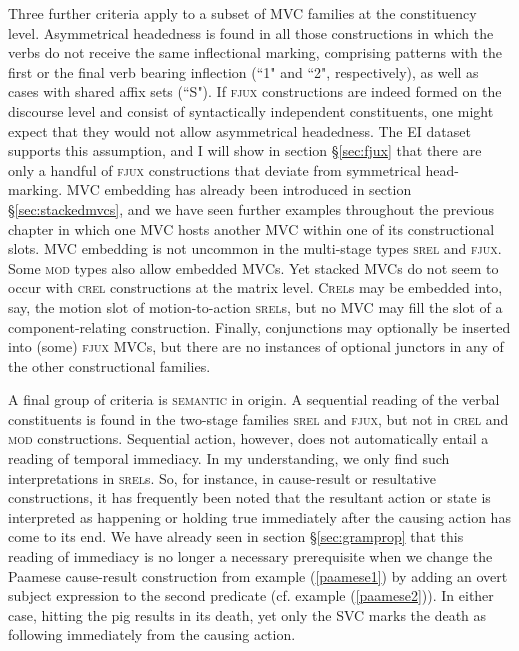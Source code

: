 Three further criteria apply to a subset of MVC families at the constituency level. Asymmetrical headedness is found in all those constructions in which the verbs do not receive the same inflectional marking, comprising patterns with the first or the final verb bearing inflection (``1" and ``2", respectively), as well as cases with shared affix sets (``S"). If \textsc{fjux} constructions are indeed formed on the discourse level and consist of syntactically independent constituents, one might expect that they would not allow asymmetrical headedness. The EI dataset supports this assumption, and I will show in section §\ref{sec:fjux} that there are only a handful of \textsc{fjux} constructions that deviate from symmetrical head-marking. MVC embedding has already been introduced in section §\ref{sec:stackedmvcs}, and we have seen further examples throughout the previous chapter in which one MVC hosts another MVC within one of its constructional slots. MVC embedding is not uncommon in the multi-stage types \textsc{srel} and \textsc{fjux}. Some \textsc{mod} types also allow embedded MVCs. Yet stacked MVCs do not seem to occur with \textsc{crel} constructions at the matrix level. \textsc{Crel}s may be embedded into, say, the motion slot of motion-to-action \textsc{srel}s, but no MVC may fill the slot of a component-relating construction. Finally, conjunctions may optionally be inserted into (some) \textsc{fjux} MVCs, but there are no instances of optional junctors in any of the other constructional families.

A final group of criteria is \textsc{semantic} in origin. A sequential reading of the verbal constituents is found in the two-stage families \textsc{srel} and \textsc{fjux}, but not in \textsc{crel} and \textsc{mod} constructions. Sequential action, however, does not automatically entail a reading of temporal immediacy. In my understanding, we only find such interpretations in \textsc{srel}s. So, for instance, in cause-result or resultative constructions, it has frequently been noted that the resultant action or state is interpreted as happening or holding true immediately after the causing action has come to its end. We have already seen in section §\ref{sec:gramprop} that this reading of immediacy is no longer a necessary prerequisite when we change the Paamese cause-result construction from example (\ref{paamese1}) by adding an overt subject expression to the second predicate (cf. example (\ref{paamese2})). In either case, hitting the pig results in its death, yet only the SVC marks the death as following immediately from the causing action. 

